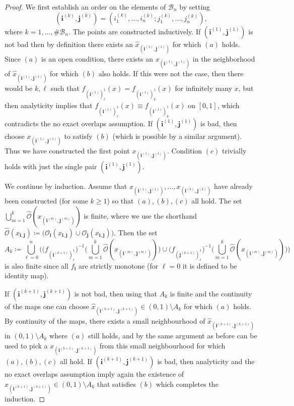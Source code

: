 \documentclass[11pt,]{article}
\theoremstyle{definition}
\theoremstyle{remark}
\newcommand{\0}{\mathbf{0}}
\newcommand{\bi}{\mathbf{i}}
\newcommand{\bj}{\mathbf{j}}
\begin{document}
\begin{proof}
We first establish an order on the elements of $\mathcal{B}_n$ by setting
\[
  (\bi^{(k)},\bj^{(k)})=(i_1^{(k)},\ldots,
i_n^{(k)};j_1^{(k)},\ldots,j_n^{(k)}),
\]
where $k=1,\ldots,\#\mathcal{B}_n$. The points are constructed
inductively. If $(\bi^{(1)},\bj^{(1)})$ is not bad then by definition there exists an $\hat
x_{(\bi^{(1)},\bj^{(1)})}$ for which $(a)$ holds. Since $(a)$ is an open condition, there exists an
$x_{(\bi^{(1)},\bj^{(1)})}$ in the neighborhood of $\hat x_{(\bi^{(1)},\bj^{(1)})}$ for which $(b)$
also holds. If this were not the case, then there would be $k,\ell$ such that
$f_{(\bi^{(1)})_{\ell}^1}(x)=f_{(\bi^{(1)})_{k}^1}(x)$ for infinitely many $x$, but then analyticity
implies that $f_{(\bi^{(1)})_{\ell}^1}(x)\equiv f_{(\bi^{(1)})_{k}^1}(x)$ on $[0,1]$, which contradicts the no
exact overlaps assumption. If $(\bi^{(1)},\bj^{(1)})$ is bad, then choose
$x_{(\bi^{(1)},\bj^{(1)})}$ to satisfy $(b)$ (which is possible by a similar argument). Thus we have
constructed the first point $x_{(\bi^{(1)},\bj^{(1)})}$. Condition $(c)$ trivially holds with just
the single pair $(\bi^{(1)},\bj^{(1)})$. 

We continue by induction. Assume that $x_{(\bi^{(1)},\bj^{(1)})},\ldots,x_{(\bi^{(k)},\bj^{(k)})}$
have already been constructed (for some $k\geq 1$) so that $(a),(b),(c)$ all hold. The set
$\bigcup_{m=1}^k \widehat{\mathcal{O}}(x_{(\bi^{(m)},\bj^{(m)})})$ is finite, where we use the
shorthand  $\widehat{\mathcal{O}}(x_{\bi,\bj})\coloneqq\big(\mathcal{O}_{\bi}(x_{\bi,\bj})\cup
\mathcal{O}_{\bj}(x_{\bi,\bj})\big)$. Then the set
\begin{equation*}
A_k\coloneqq \bigcup_{\ell=0}^n \bigg( \big(f_{(\bi^{(k+1)})_{\ell}^1}\big)^{-1} \Big(
\bigcup_{m=1}^k \widehat{\mathcal{O}}(x_{(\bi^{(m)},\bj^{(m)})}) \Big) \cup
\big(f_{(\bj^{(k+1)})_{\ell}^1}\big)^{-1} \Big( \bigcup_{m=1}^k
\widehat{\mathcal{O}}(x_{(\bi^{(m)},\bj^{(m)})}) \Big) \bigg)
\end{equation*}
is also finite since all $f_{\bi}$ are strictly monotone (for $\ell=0$ it is defined to be identity map). 

If $(\bi^{(k+1)},\bj^{(k+1)})$ is not
bad, then using that $A_k$ is finite and the continuity of the maps one can choose $\hat
x_{(\bi^{(k+1)},\bj^{(k+1)})}\in(0,1)\setminus A_k$ for which $(a)$
holds. By continuity of the maps, there exists a small neighbourhood of $\hat
x_{(\bi^{(k+1)},\bj^{(k+1)})}$ in $(0,1)\setminus A_k$ where $(a)$ still holds, and by the same
argument as before can be used to pick a $x_{(\bi^{(k+1)},\bj^{(k+1)})}$ from this small
neighbourhood for which $(a),(b),(c)$ all hold. If $(\bi^{(k+1)},\bj^{(k+1)})$ is bad, then
analyticity and the no exact overlaps assumption imply again the existence of
$x_{(\bi^{(k+1)},\bj^{(k+1)})}\in(0,1)\setminus A_k$ that satisfies $(b)$ which completes the
induction. 
\end{proof}
\end{document}
